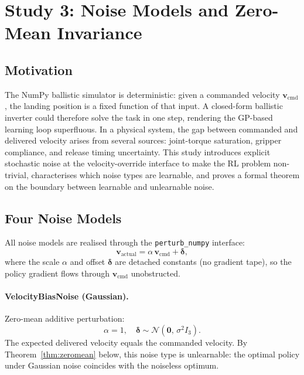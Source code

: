 \section{Study 3: Noise Models and Zero-Mean Invariance}
\label{sec:study3}

\subsection{Motivation}
\label{sec:study3:motivation}

The NumPy ballistic simulator is deterministic: given a commanded velocity
$\mathbf{v}_{\mathrm{cmd}}$, the landing position is a fixed function of that input.
A closed-form ballistic inverter could therefore solve the task in one step,
rendering the GP-based learning loop superfluous.
In a physical system, the gap between commanded and delivered velocity arises from
several sources: joint-torque saturation, gripper compliance, and release timing
uncertainty.
This study introduces explicit stochastic noise at the velocity-override interface to
make the RL problem non-trivial, characterises which noise types are learnable, and
proves a formal theorem on the boundary between learnable and unlearnable noise.

\subsection{Four Noise Models}
\label{sec:study3:models}

All noise models are realised through the \texttt{perturb\_numpy} interface:
\begin{equation}
  \mathbf{v}_{\mathrm{actual}} = \alpha\,\mathbf{v}_{\mathrm{cmd}} + \boldsymbol{\delta},
  \label{eq:perturb_interface}
\end{equation}
where the scale $\alpha$ and offset $\boldsymbol{\delta}$ are detached constants
(no gradient tape), so the policy gradient flows through $\mathbf{v}_{\mathrm{cmd}}$
unobstructed.

\paragraph{VelocityBiasNoise (Gaussian).}
Zero-mean additive perturbation:
\begin{equation}
  \alpha = 1, \quad \boldsymbol{\delta} \sim \mathcal{N}(\mathbf{0},\, \sigma^2 I_3).
  \label{eq:bias_noise}
\end{equation}
The expected delivered velocity equals the commanded velocity.
By Theorem~\ref{thm:zeromean} below, this noise type is unlearnable: the optimal
policy under Gaussian noise coincides with the noiseless optimum.

